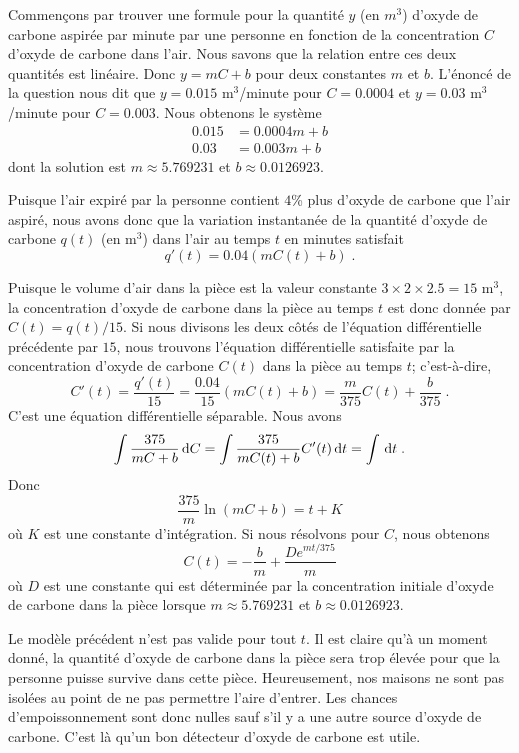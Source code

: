 {\begin{egg}[\eng]
Commençons par trouver une formule pour la quantité $y$ (en $m^3$)
d'oxyde de carbone aspirée par minute par une personne en fonction
de la concentration $C$ d'oxyde de carbone dans l'air.  Nous savons que la
relation entre ces deux quantités est linéaire.  Donc $y = m C + b$
pour deux constantes $m$ et $b$.  L'énoncé de la question nous dit que
$y=0.015$ m$^3$/minute pour $C=0.0004$ et $y=0.03$ m$^3$/minute pour $C=0.003$.
Nous obtenons le système
\begin{align*}
0.015 &= 0.0004 m + b \\
0.03 &= 0.003m + b
\end{align*}
dont la solution est $m \approx 5.769231$ et $b \approx 0.0126923$.

Puisque l'air expiré par la personne contient $4$\% plus d'oxyde de
carbone que l'air aspiré, nous avons donc que la variation instantanée de la
quantité d'oxyde de carbone $q(t)$ (en m$^3$) dans l'air au temps $t$
en minutes satisfait
\[
q'(t) = 0.04 \left(m C(t) + b\right) \; .
\]

Puisque le volume d'air dans la pièce est la valeur constante
$3\times 2 \times 2.5 = 15$ m$^3$, la concentration d'oxyde de carbone
dans la pièce au temps $t$ est donc donnée par $C(t) = q(t)/15$.  Si
nous divisons les deux côtés de l'équation différentielle précédente par
$15$, nous trouvons l'équation différentielle satisfaite par la
concentration d'oxyde de carbone $C(t)$ dans la pièce au temps $t$;
c'est-à-dire,
\[
C'(t) = \frac{q'(t)}{15} = \frac{0.04}{15} \left(m C(t) + b\right)
= \frac{m}{375} C(t) + \frac{b}{375} \; .
\]
C'est une équation différentielle séparable.  Nous avons
\[
\int \frac{375}{m C + b} \,\mathrm{d}C =
\int \frac{375}{m C(t) + b} C'(t) \,\mathrm{d}t = \int \,\mathrm{d}t \; .
\]
Donc
\[
\frac{375}{m} \ln\left(m C + b\right)
= t + K
\]
où $K$ est une constante d'intégration.  Si nous résolvons pour $C$,
nous obtenons
\[
C(t) = - \frac{b}{m} + \frac{De^{mt/375}}{m}
\]
où $D$ est une constante qui est déterminée par la concentration
initiale d'oxyde de carbone dans la pièce lorsque $m \approx 5.769231$ et
$b \approx 0.0126923$.

Le modèle précédent n'est pas valide pour tout $t$.  Il
est claire qu'à un moment donné, la quantité d'oxyde de carbone dans
la pièce sera trop élevée pour que la personne puisse survive dans
cette pièce.  Heureusement, nos maisons ne sont pas isolées au point de
ne pas permettre l'aire d'entrer.  Les chances d'empoissonnement
sont donc nulles sauf s'il y a une autre source d'oxyde de carbone.  C'est
là qu'un bon détecteur d'oxyde de carbone est utile.
\end{egg}

}
